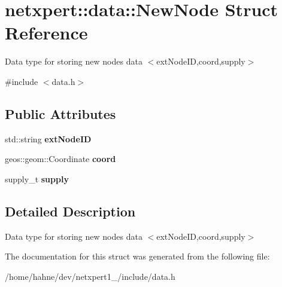 \hypertarget{structnetxpert_1_1data_1_1NewNode}{}\section{netxpert\+:\+:data\+:\+:New\+Node Struct Reference}
\label{structnetxpert_1_1data_1_1NewNode}


Data type for storing new nodes data $<$ext\+Node\+ID,coord,supply$>$  




{\ttfamily \#include $<$data.\+h$>$}

\subsection*{Public Attributes}
\begin{DoxyCompactItemize}
\item 
std\+::string {\bfseries ext\+Node\+ID}\hypertarget{structnetxpert_1_1data_1_1NewNode_a496646063edc6bac5e9635a389945f77}{}\label{structnetxpert_1_1data_1_1NewNode_a496646063edc6bac5e9635a389945f77}

\item 
geos\+::geom\+::\+Coordinate {\bfseries coord}\hypertarget{structnetxpert_1_1data_1_1NewNode_aa7ca0ee93cfd38d9029454e5473be714}{}\label{structnetxpert_1_1data_1_1NewNode_aa7ca0ee93cfd38d9029454e5473be714}

\item 
supply\+\_\+t {\bfseries supply}\hypertarget{structnetxpert_1_1data_1_1NewNode_aad7383c50430a210253740698e8ef770}{}\label{structnetxpert_1_1data_1_1NewNode_aad7383c50430a210253740698e8ef770}

\end{DoxyCompactItemize}


\subsection{Detailed Description}
Data type for storing new nodes data $<$ext\+Node\+ID,coord,supply$>$ 

The documentation for this struct was generated from the following file\+:\begin{DoxyCompactItemize}
\item 
/home/hahne/dev/netxpert1\+\_/include/data.\+h\end{DoxyCompactItemize}
